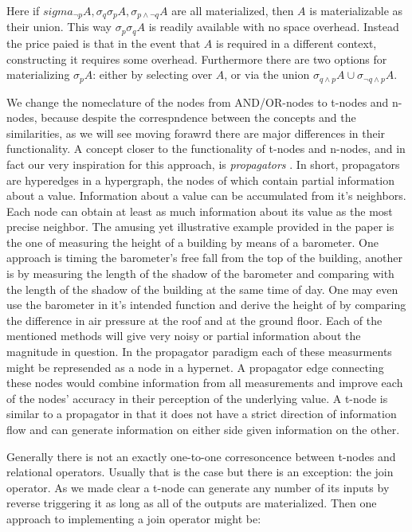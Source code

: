 Here if
\(sigma_{\neg p}A,\sigma_q \sigma_pA,\sigma_{p \land \neg q}A\) are
all materialized, then \(A\) is materializable as their union. This
way \(\sigma_p\sigma_qA\) is readily available with no space
overhead. Instead the price paied is that in the event that \(A\) is
required in a different context, constructing it requires some
overhead. Furthermore there are two options for materializing
\(\sigma_pA\): either by selecting over \(A\), or via the union
\(\sigma_{q \land p}A \cup \sigma_{\neg q \land p}A\).

We change the nomeclature of the nodes from AND/OR-nodes to t-nodes
and n-nodes, because despite the correspndence between the concepts
and the similarities, as we will see moving forawrd there are major
differences in their functionality. A concept closer to the
functionality of t-nodes and n-nodes, and in fact our very inspiration
for this approach, is \emph{propagators}
\cite{radulPropagationNetworksFlexible2009a}. In short, propagators are
hyperedges in a hypergraph, the nodes of which contain partial
information about a value. Information about a value can be
accumulated from it's neighbors. Each node can obtain at least as much
information about its value as the most precise neighbor. The amusing
yet illustrative example provided in the paper is the one of measuring
the height of a building by means of a barometer. One approach is
timing the barometer's free fall from the top of the building, another
is by measuring the length of the shadow of the barometer and
comparing with the length of the shadow of the building at the same
time of day. One may even use the barometer in it's intended function
and derive the height of by comparing the difference in air pressure
at the roof and at the ground floor. Each of the mentioned methods
will give very noisy or partial information about the magnitude in
question. In the propagator paradigm each of these measurments might
be represended as a node in a hypernet. A propagator edge connecting
these nodes would combine information from all measurements and
improve each of the nodes' accuracy in their perception of the
underlying value. A t-node is similar to a propagator in that it does
not have a strict direction of information flow and can generate
information on either side given information on the other.

Generally there is not an exactly one-to-one corresoncence between
t-nodes and relational operators. Usually that is the case but
there is an exception: the join operator. As we made clear a t-node
can generate any number of its inputs by reverse triggering it as
long as all of the outputs are materialized. Then one approach to
implementing a join operator might be:


